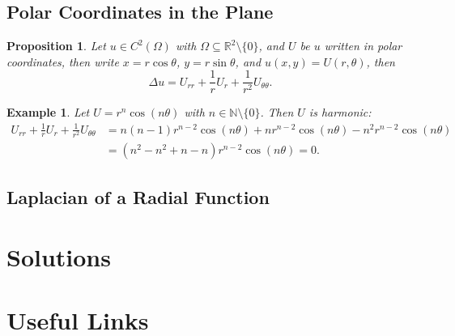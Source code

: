 \documentclass{article}
\newtheorem*{example}{Example}
\newtheorem{proposition}{Proposition}
\newcommand{\R}{\mathbb{R}}
\begin{document}
\subsection{Polar Coordinates in the Plane}
\begin{proposition}
    Let $u \in C^2(\Omega)$ with $\Omega \subseteq \R^2 \setminus \{0\}$, and $U$ be $u$ written in polar coordinates, then write $x=r\cos\theta$, $y=r\sin\theta$, and $u(x,y) = U(r,\theta)$, then
    \begin{equation}
        \Delta u = U_{rr}+\frac{1}{r}U_r + \frac{1}{r^2}U_{\theta\theta}.
    \end{equation}
\end{proposition}
\begin{example}
    Let $U = r^n\cos(n\theta)$ with $n \in \mathbb{N}\setminus\{0\}$. Then $U$ is harmonic:
    \begin{equation*}
    \begin{split}
        U_{rr}+\frac{1}{r}U_r + \frac{1}{r^2}U_{\theta\theta} &= n(n-1)r^{n-2}\cos(n\theta)+nr^{n-2}\cos(n\theta)-n^2r^{n-2}\cos(n\theta)\\ &= (n^2-n^2+n-n)r^{n-2}\cos(n\theta)=0.
    \end{split}
    \end{equation*}
\end{example}

\subsection{Laplacian of a Radial Function}


\newpage
\appendix
\section{Solutions}

\section{Useful Links}
\end{document}
